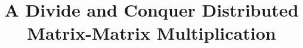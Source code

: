 \documentclass[conference,10pt]{IEEEtran}
\begin{document}
\title{A Divide and Conquer Distributed Matrix-Matrix Multiplication\\
}

\end{document}
